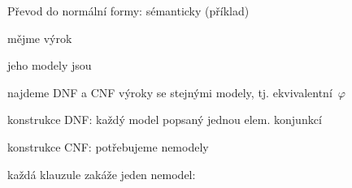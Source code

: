 \documentclass{beamer}
\begin{document}
\begin{frame}{Převod do normální formy: sémanticky (příklad)}

    mějme výrok 

    \pause

    jeho modely jsou 

    \pause

    najdeme DNF a CNF výroky se stejnými modely, tj. ekvivalentní~$\varphi$

    \pause
    \bigskip

    \alert{konstrukce DNF:} každý model popsaný jednou elem. konjunkcí

    \pause
    \bigskip

    \alert{konstrukce CNF:} potřebujeme \alert{nemodely}

    \pause
    každá klauzule zakáže jeden nemodel: 

\end{frame}
\end{document}
